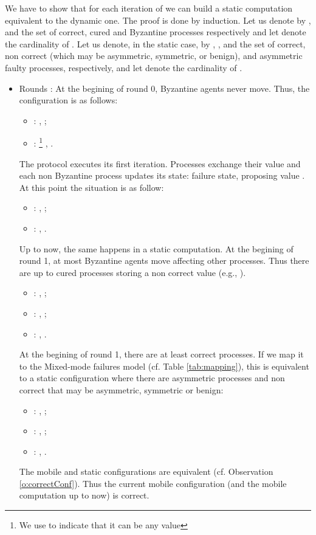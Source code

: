 \begin{proofT}
We have to show that for each iteration of  we can build a static computation equivalent to the dynamic one. The proof is done by induction. Let us denote by ,  and  the set of correct, cured and Byzantine processes respectively and let  denote the cardinality of . Let us denote, in the static case, by , , and  the set of correct, non correct (which may be asymmetric, symmetric, or benign), and asymmetric faulty processes, respectively, and let  denote the cardinality of .

\begin{itemize}
\item{Rounds :} At the begining of round 0, Byzantine agents never move. Thus, the configuration is as follows: 
\begin{itemize} 
\item{}: , ;
\item{}:  \footnote{We use  to indicate that it can be any value} , .
\end{itemize}
The protocol executes its first iteration. 
Processes exchange their value and each non Byzantine process  updates its state: failure state, proposing value  . 
At this point the situation is as follow:
\begin{itemize}
\item{}: , ;
\item{}: , .
\end{itemize}
Up to now, the same happens in a static computation. 
At the begining of round 1, at most  Byzantine agents move affecting other processes. Thus there are up to  cured processes storing a non correct value (e.g., ). 
\begin{itemize}
\item{}: , ;
\item{}: , ;
\item{}: , .
\end{itemize}
At the begining of round 1, there are at least  correct processes. If we map it to the Mixed-mode failures model (cf. Table \ref{tab:mapping}), this is equivalent to a static configuration where there are  asymmetric processes and  non correct that may be asymmetric, symmetric or benign:
\begin{itemize}
\item{}: , ;
\item{}: , ;
\item{}: , .
\end{itemize}
The mobile and static configurations are equivalent (cf. Observation \ref{o:correctConf}). Thus the current mobile configuration (and the mobile computation up to now) is correct.



\end{itemize}
\end{proofT}
